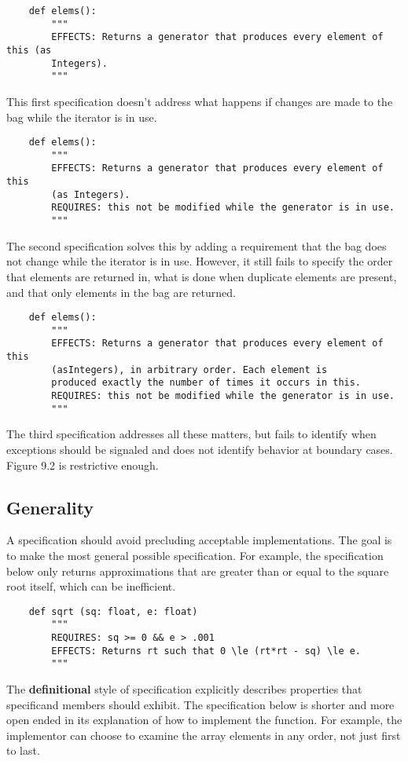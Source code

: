 \documentclass[oneside,11pt,dvipsnames]{book}
\begin{document}
\begin{lstlisting}
    def elems():
        """
        EFFECTS: Returns a generator that produces every element of this (as 
        Integers).
        """
\end{lstlisting}
This first specification doesn’t address what happens if changes are made to the bag while the iterator is in use.
\begin{lstlisting}
    def elems():
        """
        EFFECTS: Returns a generator that produces every element of this
        (as Integers).
        REQUIRES: this not be modified while the generator is in use.
        """
\end{lstlisting}
The second specification solves this by adding a requirement that the bag does not change while the iterator is in use. However, it still fails to specify the order that elements are returned in, what is done when duplicate elements are present, and that only elements in the bag are returned.
\begin{lstlisting}
    def elems():
        """
        EFFECTS: Returns a generator that produces every element of this
        (asIntegers), in arbitrary order. Each element is
        produced exactly the number of times it occurs in this.
        REQUIRES: this not be modified while the generator is in use.
        """

\end{lstlisting}
The third specification addresses all these matters, but fails to identify when exceptions should be signaled and does not identify behavior at boundary cases. Figure 9.2 is restrictive enough.

\subsection{Generality}
A specification should avoid precluding acceptable implementations. The goal is to make the most general possible specification. For example, the specification below only returns approximations that are greater than or equal to the square root itself, which can be inefficient.

\begin{lstlisting}
    def sqrt (sq: float, e: float)
        """
        REQUIRES: sq >= 0 && e > .001
        EFFECTS: Returns rt such that 0 \le (rt*rt - sq) \le e.
        """
\end{lstlisting}
The \textbf{definitional} style of specification explicitly describes properties that specificand members should exhibit. The specification below is shorter and more open ended in its explanation of how to implement the function. For example, the implementor can choose to examine the array elements in any order, not just first to last.
\end{document}
